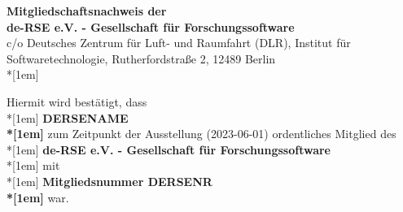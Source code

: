 \documentclass[../Vorlagen/de-RSE_Kopf,a4paper]{scrlttr2}
\begin{document}
\begin{letter}{}
\opening{}
\vspace{-9cm}
\begin{centering}
{\large\textbf{Mitgliedschaftsnachweis der\\de-RSE e.V. - Gesellschaft für Forschungssoftware}}\\
{\tiny c/o Deutsches Zentrum für Luft- und Raumfahrt (DLR), Institut für Softwaretechnologie, Rutherfordstraße 2, 12489 Berlin}\\*[1em]

\vspace{3em}
Hiermit wird bestätigt, dass\\*[1em]
\textbf{DERSENAME\\*[1em]}
zum Zeitpunkt der Ausstellung (2023-06-01) ordentliches Mitglied des\\*[1em]
\textbf{de-RSE e.V. - Gesellschaft für Forschungssoftware}\\*[1em]
mit\\*[1em]
\textbf{Mitgliedsnummer DERSENR\\*[1em]}
war.

\end{centering}
\end{letter}
\end{document}
